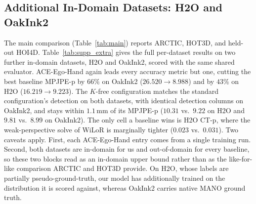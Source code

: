 \documentclass[10pt,twocolumn,letterpaper]{article}
\newcommand{\method}{ACE-Ego-Hand} %
\begin{document}
\subsection{Additional In-Domain Datasets: H2O and OakInk2}
\label{sec:supp_extra}
The main comparison (Table~\ref{tab:main}) reports ARCTIC, HOT3D, and held-out HOI4D. Table~\ref{tab:supp_extra} gives the full per-dataset results on two further in-domain datasets, H2O and OakInk2, scored with the same shared evaluator. \method{} again leads every accuracy metric but one, cutting the best baseline MPJPE-p by $66\%$ on OakInk2 ($26.520{\to}8.988$) and by $43\%$ on H2O ($16.219{\to}9.223$). The $K$-free configuration matches the standard configuration's detection on both datasets, with identical detection columns on OakInk2, and stays within $1.1$\,mm of its MPJPE-p ($10.31$ vs.\ $9.22$ on H2O and $9.81$ vs.\ $8.99$ on OakInk2). The only cell a baseline wins is H2O CT-p, where the weak-perspective solve of WiLoR is marginally tighter ($0.023$ vs.\ $0.031$). Two caveats apply. First, each \method{} entry comes from a single training run. Second, both datasets are in-domain for us and out-of-domain for every baseline, so these two blocks read as an in-domain upper bound rather than as the like-for-like comparison ARCTIC and HOT3D provide. On H2O, whose labels are partially pseudo-ground-truth, our model has additionally trained on the distribution it is scored against, whereas OakInk2 carries native MANO ground truth.
\end{document}
